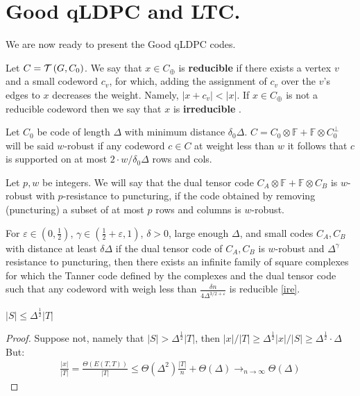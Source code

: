 \chapter{Good qLDPC and LTC.}
We are now ready to present the Good qLDPC codes. 
  \begin{definition} Let $C = \mathcal{T}\left( G, C_0 \right)$. We say that $x \in C_{\oplus}$ is \textbf{reducible} if there exists a vertex $v$ and a small codeword $c_v$, for which, adding the assignment of $c_v$ over the $v$'s edges to $x$ decreases the weight. Namely, $|x + c_{v}| < |x|$. If $x \in C_{\oplus}$ is not a reducible codeword then we say that $x$ is \textbf{irreducible} \label{ire}. \end{definition}


\begin{definition}[$w$-Robustness] Let $C_{0}$ be code of length $\Delta$ with minimum distance $\delta_{0}\Delta$. $C = C_{0} \otimes \mathbb{F} + \mathbb{F}\otimes C_{0}^{\perp}$ will be said $w$-robust if any codeword $c \in C$ at weight less than $w$ it follows that $c$ is supported on at most $2\cdot w/\delta_{0}\Delta$ rows and cols.
\end{definition}

\begin{definition} Let $p,w$ be integers. We will say that the dual tensor code $C_{A} \otimes \mathbb{F} + \mathbb{F} \otimes C_{B}$ is $w$-robust with $p$-resistance to puncturing, if the code obtained by removing (puncturing) a subset of at most $p$ rows and columns is $w$-robust.   
\end{definition}

\begin{theorem}
  For $\varepsilon \in \left( 0,\frac{1}{2} \right)$, $\gamma\in \left( \frac{1}{2} + \varepsilon, 1 \right)$, $\delta> 0$, large enough $\Delta$, and small codes $C_{A},C_{B}$ with distance at least $\delta\Delta$ if the dual tensor code of $C_{A},C_{B}$ is $w$-robust and $\Delta^{\gamma}$ resistance to puncturing, then there exists an infinite family of square complexes for which the Tanner code defined by the complexes and the dual tensor code such that any codeword with weigh less than $ \frac{\delta n}{4\Delta^{3/2 + \varepsilon}} $ is reducible \cref{ire}.
\end{theorem}

\begin{claim}
  $ |S| \le \Delta^{\frac{1}{2}}|T| $ 
\end{claim}
\begin{proof}
Suppose not, namely that $|S| > \Delta^{\frac{1}{2}}|T|$, then $|x|/|T| \ge \Delta^{\frac{1}{2}}|x|/|S| \ge \Delta^{\frac{1}{2}} \cdot \Delta $ But:  
\begin{equation*}
  \begin{split}
    \frac{|x|}{|T|} = \frac{\Theta \left(E(T,T) \right)}{|T|} \le \Theta(\Delta^{2})\frac{|T|}{n}  + \Theta(\Delta)  \rightarrow_{n\rightarrow \infty} \Theta(\Delta)
  \end{split}
\end{equation*}
\end{proof}

